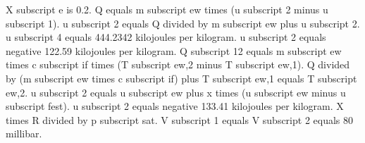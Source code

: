 X subscript e is 0.2.
Q equals m subscript ew times (u subscript 2 minus u subscript 1).
u subscript 2 equals Q divided by m subscript ew plus u subscript 2.
u subscript 4 equals 444.2342 kilojoules per kilogram.
u subscript 2 equals negative 122.59 kilojoules per kilogram.
Q subscript 12 equals m subscript ew times c subscript if times (T subscript ew,2 minus T subscript ew,1).
Q divided by (m subscript ew times c subscript if) plus T subscript ew,1 equals T subscript ew,2.
u subscript 2 equals u subscript ew plus x times (u subscript ew minus u subscript fest).
u subscript 2 equals negative 133.41 kilojoules per kilogram.
X times R divided by p subscript sat.
V subscript 1 equals V subscript 2 equals 80 millibar.